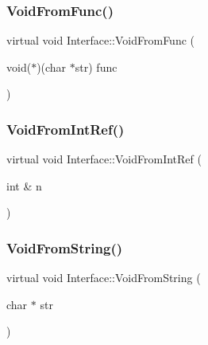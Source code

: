 \subsubsection{\texorpdfstring{VoidFromFunc()}{VoidFromFunc()}}
{\footnotesize\ttfamily virtual void Interface\+::\+Void\+From\+Func (\begin{DoxyParamCaption}\item[{void($\ast$)(char $\ast$str)}]{func }\end{DoxyParamCaption})\hspace{0.3cm}{\ttfamily [pure virtual]}}

\mbox{\label{classInterface_aa43fb56650a57b6b3e7743e54e50cb86}} 
\subsubsection{\texorpdfstring{VoidFromIntRef()}{VoidFromIntRef()}}
{\footnotesize\ttfamily virtual void Interface\+::\+Void\+From\+Int\+Ref (\begin{DoxyParamCaption}\item[{int \&}]{n }\end{DoxyParamCaption})\hspace{0.3cm}{\ttfamily [pure virtual]}}

\mbox{\label{classInterface_a65d6ae604e7e9a513aec72c9c94e0b97}} 
\subsubsection{\texorpdfstring{VoidFromString()}{VoidFromString()}}
{\footnotesize\ttfamily virtual void Interface\+::\+Void\+From\+String (\begin{DoxyParamCaption}\item[{char $\ast$}]{str }\end{DoxyParamCaption})\hspace{0.3cm}{\ttfamily [pure virtual]}}

\mbox{\label{classInterface_ae84fe7e53f881db2f823ad35d004927a}} 
